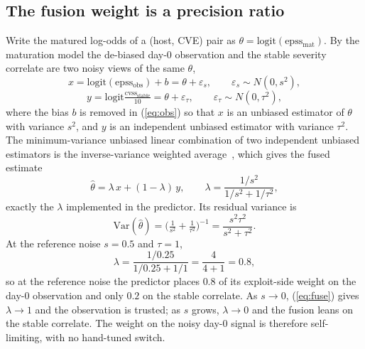 \documentclass[journal]{IEEEtran}
\begin{document}
\subsection{The fusion weight is a precision ratio}
Write the matured log-odds of a (host, CVE) pair as $\theta = \mathrm{logit}(\mathrm{epss_{mat}})$.
By the maturation model the de-biased day-0 observation and the stable severity correlate are two
noisy views of the same $\theta$,
\begin{equation}
\label{eq:obs}
x = \mathrm{logit}(\mathrm{epss_{obs}}) + b = \theta + \varepsilon_s, \qquad \varepsilon_s \sim N(0, s^2),
\end{equation}
\begin{equation}
\label{eq:stable}
y = \mathrm{logit}\tfrac{\mathrm{cvss_{stable}}}{10} = \theta + \varepsilon_\tau, \qquad \varepsilon_\tau \sim N(0, \tau^2),
\end{equation}
where the bias $b$ is removed in (\ref{eq:obs}) so that $x$ is an unbiased estimator of $\theta$
with variance $s^2$, and $y$ is an independent unbiased estimator with variance $\tau^2$. The
minimum-variance unbiased linear combination of two independent unbiased estimators is the
inverse-variance weighted average~\cite{cover2006elements}, which gives the fused estimate
\begin{equation}
\label{eq:fuse}
\hat\theta = \lambda\,x + (1-\lambda)\,y, \qquad
\lambda = \frac{1/s^2}{1/s^2 + 1/\tau^2},
\end{equation}
exactly the $\lambda$ implemented in the predictor. Its residual variance is
\begin{equation}
\label{eq:fusevar}
\mathrm{Var}(\hat\theta) = \Big(\tfrac{1}{s^2} + \tfrac{1}{\tau^2}\Big)^{-1} = \frac{s^2 \tau^2}{s^2 + \tau^2}.
\end{equation}
At the reference noise $s = 0.5$ and $\tau = 1$,
\begin{equation}
\label{eq:lambdaref}
\lambda = \frac{1/0.25}{1/0.25 + 1/1} = \frac{4}{4+1} = 0.8,
\end{equation}
so at the reference noise the predictor places $0.8$ of its exploit-side weight on the day-0
observation and only $0.2$ on the stable correlate. As $s \to 0$, (\ref{eq:fuse}) gives
$\lambda \to 1$ and the observation is trusted; as $s$ grows, $\lambda \to 0$ and the fusion leans on
the stable correlate. The weight on the noisy day-0 signal is therefore self-limiting, with no
hand-tuned switch.
\end{document}
